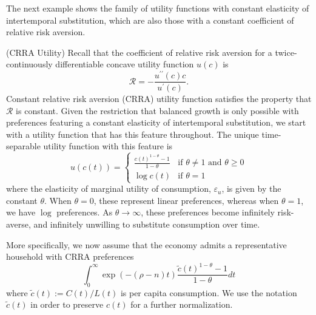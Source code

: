 \documentclass[\topdir/lecture\_notes.tex]{subfiles}
\begin{document}
The next example shows the family of utility functions with constant elasticity of intertemporal substitution, which are also those with a constant coefficient of relative risk aversion.

\begin{example} (CRRA Utility)\label{ex:crra}
  Recall that the coefficient of relative risk aversion for a twice-continuously differentiable concave utility function $u(c)$ is
  \[
    \mathcal{R}=-\frac{u^{\prime \prime}(c) c}{u^{\prime}(c)}.
  \]
  Constant relative risk aversion (CRRA) utility function satisfies the property that $\mathcal{R}$ is constant. Given the restriction that balanced growth is only possible with preferences featuring a constant elasticity of intertemporal substitution, we start with a utility function that has this feature throughout. The unique time-separable utility function with this feature is
  \begin{equation}
    u(c(t)) = \begin{cases}
      \frac{c(t)^{1-\theta}-1}{1-\theta} & \text{if } \theta \neq 1 \text{ and } \theta \geq 0 \\
      \log c(t)                          & \text{if } \theta = 1
    \end{cases}
    \label{eq:crra-utility}
  \end{equation}
  where the elasticity of marginal utility of consumption, $\varepsilon_{u}$, is given by the constant $\theta$. When $\theta=0$, these represent linear preferences, whereas when $\theta=1$, we have $\log$ preferences. As $\theta \rightarrow \infty$, these preferences become infinitely risk-averse, and infinitely unwilling to substitute consumption over time.
\end{example}

More specifically, we now assume that the economy admits a representative household with CRRA preferences
\[
  \int_{0}^{\infty} \exp(-(\rho-n) t) \frac{\tilde{c}(t)^{1-\theta}-1}{1-\theta} dt
\]
where $\tilde{c}(t) := C(t) / L(t)$ is per capita consumption. We use the notation $\tilde{c}(t)$ in order to preserve $c(t)$ for a further normalization.
\end{document}

